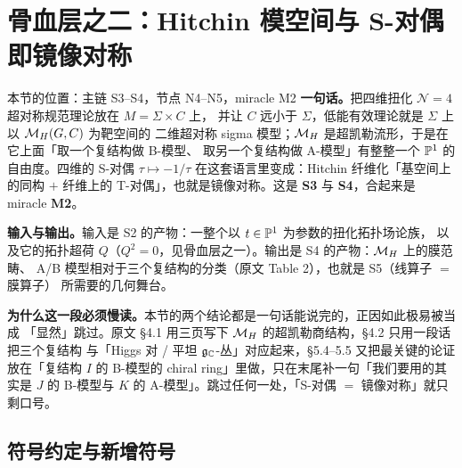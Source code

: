 
\section{骨血层之二：Hitchin 模空间与 S-对偶即镜像对称}
\label{sec:flesh-hitchin}

\begin{kcard}{本节的位置：主链 S3--S4，节点 N4--N5，miracle M2}
\textbf{一句话。}把四维扭化 $\mathcal N=4$ 超对称规范理论放在 $M=\Sigma\times C$ 上，
并让 $C$ 远小于 $\Sigma$，低能有效理论就是 $\Sigma$ 上以 $\mathcal{M}_H(G,C)$ 为靶空间的
二维超对称 sigma 模型；$\mathcal{M}_H$ 是超凯勒流形，于是在它上面「取一个复结构做 B-模型、
取另一个复结构做 A-模型」有整整一个 $\mathbb{P}^1$ 的自由度。四维的 S-对偶
$\tau\mapsto-1/\tau$ 在这套语言里变成：Hitchin 纤维化「基空间上的同构 $+$ 纤维上的
T-对偶」，也就是镜像对称。这是 \textbf{S3} 与 \textbf{S4}，合起来是 miracle \textbf{M2}。
\pA{}\pA{}

\textbf{输入与输出。}输入是 S2 的产物：一整个以 $t\in\mathbb{P}^1$ 为参数的扭化拓扑场论族，
以及它的拓扑超荷 $Q$（$Q^2=0$，见骨血层之一）。输出是 S4 的产物：$\mathcal{M}_H$ 上的膜范畴、
A/B 模型相对于三个复结构的分类（原文 Table 2），也就是 S5（线算子 $=$ 膜算子）
所需要的几何舞台。\pB{}

\textbf{为什么这一段必须慢读。}本节的两个结论都是一句话能说完的，正因如此极易被当成
「显然」跳过。原文 §4.1 用三页写下 $\mathcal{M}_H$ 的超凯勒商结构，§4.2 只用一段话把三个复结构
与「Higgs 对 / 平坦 $\mathfrak{g}_{\mathbb{C}}$-丛」对应起来，§5.4--5.5 又把最关键的论证放在「复结构 $I$ 的
B-模型的 chiral ring」里做，只在末尾补一句「我们要用的其实是 $J$ 的 B-模型与 $K$ 的
A-模型」。跳过任何一处，「S-对偶 $=$ 镜像对称」就只剩口号。
\end{kcard}

\subsection*{符号约定与新增符号}


